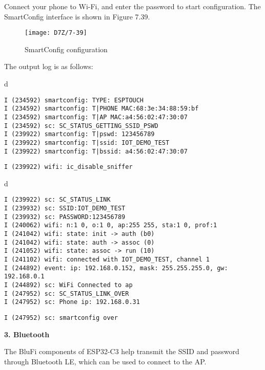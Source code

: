 \documentclass[a4paper,12pt]{book}
\begin{document}

Connect your phone to Wi-Fi, and enter the password to start configuration. The SmartConfig interface is shown in Figure 7.39.

\begin{figure}[!h]
    \centering
    \texttt{[image: D7Z/7-39]}
    \caption{SmartConfig configuration}
\end{figure}

The output log is as follows:

\begin{codebloc}
\begin{tabular}{d}
\vspace{2pt}
\begin{verbatim}
I (234592) smartconfig: TYPE: ESPTOUCH
I (234592) smartconfig: T|PHONE MAC:68:3e:34:88:59:bf
I (234592) smartconfig: T|AP MAC:a4:56:02:47:30:07
I (234592) sc: SC_STATUS_GETTING_SSID_PSWD
I (239922) smartconfig: T|pswd: 123456789
I (239922) smartconfig: T|ssid: IOT_DEMO_TEST
I (239922) smartconfig: T|bssid: a4:56:02:47:30:07
\end{verbatim}
\verb|I (239922) wifi: ic_disable_sniffer|
\end{tabular}
\end{codebloc}

\begin{codebloc}
\begin{tabular}{d}
\vspace{2pt}
\begin{verbatim}
I (239922) sc: SC_STATUS_LINK
I (239932) sc: SSID:IOT_DEMO_TEST
I (239932) sc: PASSWORD:123456789
I (240062) wifi: n:1 0, o:1 0, ap:255 255, sta:1 0, prof:1
I (241042) wifi: state: init -> auth (b0)
I (241042) wifi: state: auth -> assoc (0)
I (241052) wifi: state: assoc -> run (10)
I (241102) wifi: connected with IOT_DEMO_TEST, channel 1
I (244892) event: ip: 192.168.0.152, mask: 255.255.255.0, gw: 192.168.0.1
I (244892) sc: WiFi Connected to ap
I (247952) sc: SC_STATUS_LINK_OVER
I (247952) sc: Phone ip: 192.168.0.31
\end{verbatim}
\verb|I (247952) sc: smartconfig over|
\end{tabular}
\end{codebloc}

\textbf{3. Bluetooth}

The BluFi components of ESP32-C3 help transmit the SSID and password through Bluetooth LE, which can be used to connect to the AP.
\end{document}
